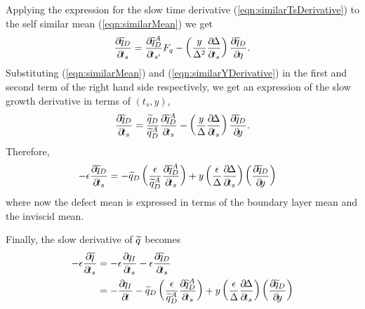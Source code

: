 {Applying the expression for the slow time derivative
(\ref{eqn:similarTsDerivative}) to the self similar mean (\ref{eqn:similarMean}) we
get
%
\begin{equation}
\label{eqn:similarTsDerivativeMean}
\pp{\fav{q}_D}{t_s}
      = \pp{\fav{q}_D^A}{t_{s'}} F_q
        - \left(\frac{y}{\Delta^2} \pp{\Delta}{t_s}\right) \pp{\fav{q}_D}{\eta}.
\end{equation}
%
%
Substituting (\ref{eqn:similarMean}) and (\ref{eqn:similarYDerivative})
in the first and second term of the right hand side respectively, we get
an expression of the slow growth derivative in terms of $(t_s,y)$,
%
\begin{equation}
\label{eqn:tsDerivativeMean0}
\pp{\fav{q}_D}{t_s}
      = \frac{\fav{q}_D}{\fav{q}_D^A}
        \pp{\fav{q}_D^A}{t_s}
        - \left(\frac{y}{\Delta} \pp{\Delta}{t_s}\right)
          \pp{\fav{q}_D}{y}.
\end{equation}
%
Therefore,
%
\begin{align} \label{eqn:rhoUDsourceDt}
- \epsilon \pp{\fav{q}_D}{t_s}
   & = -\fav{q}_D
           \left(\frac{\epsilon}{\fav{q}_D^A}
           \pp{\fav{q}_D^A}{t_s}
       \right)
      + y
         \left(\frac{\epsilon}{\Delta} \pp{\Delta}{t_s}\right)  \left(
             \pp{\fav{q}_D}{y}
         \right)
\end{align}
where now the defect mean is expressed in terms of the boundary layer mean
and the inviscid mean.

Finally, the slow derivative of $\widetilde{q}$ becomes
%
\begin{align} \label{eqn:rhoUsourceDt}
- \epsilon \pp{\fav{q}}{t_s} &=
- \epsilon \pp{q_I}{t_s} - \epsilon \pp{\fav{q}_D}{t_s}  \notag \\
   & = - \pp{q_I}{t}
       - \fav{q}_D
           \left(\frac{\epsilon}{\fav{q}_D^A}
           \pp{\fav{q}_D^A}{t_s}
       \right)
      + y
         \left(\frac{\epsilon}{\Delta} \pp{\Delta}{t_s}\right)  \left(
             \pp{\fav{q}_D}{y}
         \right)
\end{align}
%

}

